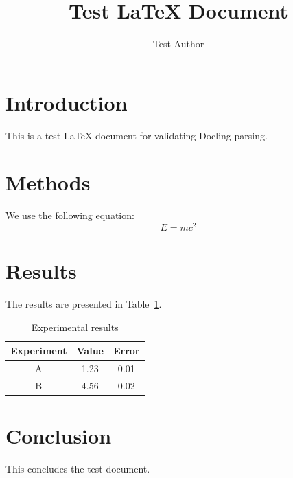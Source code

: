 \documentclass{article}
\title{Test LaTeX Document}
\author{Test Author}
\begin{document}
\maketitle

\section{Introduction}
This is a test LaTeX document for validating Docling parsing.

\section{Methods}
We use the following equation:
\begin{equation}
E = mc^2
\end{equation}

\section{Results}
The results are presented in Table~\ref{tab:results}.

\begin{table}[h]
\centering
\begin{tabular}{|c|c|c|}
\hline
Experiment & Value & Error \\
\hline
A & 1.23 & 0.01 \\
B & 4.56 & 0.02 \\
\hline
\end{tabular}
\caption{Experimental results}
\label{tab:results}
\end{table}

\section{Conclusion}
This concludes the test document.
\end{document}

